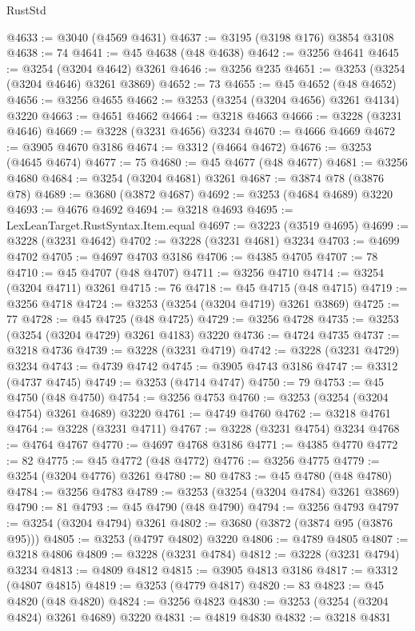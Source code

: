 \begin{lexlean}{RustStd}
\begin{coremodule}
@4633 := @3040 (@4569 @4631)
@4637 := @3195 (@3198 @176) @3854 @3108
@4638 := 74
@4641 := @45 @4638 (@48 @4638)
@4642 := @3256 @4641
@4645 := @3254 (@3204 @4642) @3261
@4646 := @3256 @235
@4651 := @3253 (@3254 (@3204 @4646) @3261 @3869)
@4652 := 73
@4655 := @45 @4652 (@48 @4652)
@4656 := @3256 @4655
@4662 := @3253 (@3254 (@3204 @4656) @3261 @4134) @3220
@4663 := @4651 @4662
@4664 := @3218 @4663
@4666 := @3228 (@3231 @4646)
@4669 := @3228 (@3231 @4656) @3234
@4670 := @4666 @4669
@4672 := @3905 @4670 @3186
@4674 := @3312 (@4664 @4672)
@4676 := @3253 (@4645 @4674)
@4677 := 75
@4680 := @45 @4677 (@48 @4677)
@4681 := @3256 @4680
@4684 := @3254 (@3204 @4681) @3261
@4687 := @3874 @78 (@3876 @78)
@4689 := @3680 (@3872 @4687)
@4692 := @3253 (@4684 @4689) @3220
@4693 := @4676 @4692
@4694 := @3218 @4693
@4695 := LexLeanTarget.RustSyntax.Item.equal
@4697 := @3223 (@3519 @4695)
@4699 := @3228 (@3231 @4642)
@4702 := @3228 (@3231 @4681) @3234
@4703 := @4699 @4702
@4705 := @4697 @4703 @3186
@4706 := @4385 @4705
@4707 := 78
@4710 := @45 @4707 (@48 @4707)
@4711 := @3256 @4710
@4714 := @3254 (@3204 @4711) @3261
@4715 := 76
@4718 := @45 @4715 (@48 @4715)
@4719 := @3256 @4718
@4724 := @3253 (@3254 (@3204 @4719) @3261 @3869)
@4725 := 77
@4728 := @45 @4725 (@48 @4725)
@4729 := @3256 @4728
@4735 := @3253 (@3254 (@3204 @4729) @3261 @4183) @3220
@4736 := @4724 @4735
@4737 := @3218 @4736
@4739 := @3228 (@3231 @4719)
@4742 := @3228 (@3231 @4729) @3234
@4743 := @4739 @4742
@4745 := @3905 @4743 @3186
@4747 := @3312 (@4737 @4745)
@4749 := @3253 (@4714 @4747)
@4750 := 79
@4753 := @45 @4750 (@48 @4750)
@4754 := @3256 @4753
@4760 := @3253 (@3254 (@3204 @4754) @3261 @4689) @3220
@4761 := @4749 @4760
@4762 := @3218 @4761
@4764 := @3228 (@3231 @4711)
@4767 := @3228 (@3231 @4754) @3234
@4768 := @4764 @4767
@4770 := @4697 @4768 @3186
@4771 := @4385 @4770
@4772 := 82
@4775 := @45 @4772 (@48 @4772)
@4776 := @3256 @4775
@4779 := @3254 (@3204 @4776) @3261
@4780 := 80
@4783 := @45 @4780 (@48 @4780)
@4784 := @3256 @4783
@4789 := @3253 (@3254 (@3204 @4784) @3261 @3869)
@4790 := 81
@4793 := @45 @4790 (@48 @4790)
@4794 := @3256 @4793
@4797 := @3254 (@3204 @4794) @3261
@4802 := @3680 (@3872 (@3874 @95 (@3876 @95)))
@4805 := @3253 (@4797 @4802) @3220
@4806 := @4789 @4805
@4807 := @3218 @4806
@4809 := @3228 (@3231 @4784)
@4812 := @3228 (@3231 @4794) @3234
@4813 := @4809 @4812
@4815 := @3905 @4813 @3186
@4817 := @3312 (@4807 @4815)
@4819 := @3253 (@4779 @4817)
@4820 := 83
@4823 := @45 @4820 (@48 @4820)
@4824 := @3256 @4823
@4830 := @3253 (@3254 (@3204 @4824) @3261 @4689) @3220
@4831 := @4819 @4830
@4832 := @3218 @4831

\end{coremodule}
\end{lexlean}
